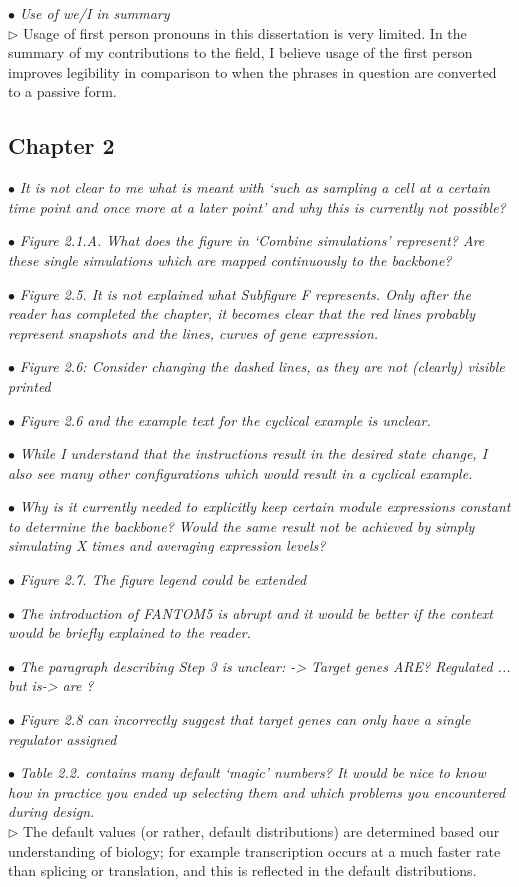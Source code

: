 \documentclass[10pt]{article}
\newcommand{\exam}[2][\  ]{\hspace{0pt}\marginpar{\color{myred}#1}$\bullet$ \textit{#2}}
\newcommand{\answ}[1]{{\color{myblue} $\triangleright$ #1}}
\begin{document}
\exam{Use of we/I in summary} \\
\answ{Usage of first person pronouns in this dissertation is very limited. In the summary of my contributions to the field, I believe usage of the first person improves legibility in comparison to when the phrases in question are converted to a passive form.}



\subsection{Chapter 2}

\exam{It is not clear to me what is meant with ‘such as sampling a cell at a certain
	time point and once more at a later point’ and why this is currently not
	possible?}

\exam{Figure 2.1.A. What does the figure in ‘Combine simulations’ represent? Are
		these single simulations which are mapped continuously to the backbone?}

\exam{Figure 2.5. It is not explained what Subfigure F represents. Only after the
	reader has completed the chapter, it becomes clear that the red lines probably
	represent snapshots and the lines, curves of gene expression.}

\exam{Figure 2.6: Consider changing the dashed lines, as they are not (clearly)
		visible printed}
	
\exam{Figure 2.6 and the example text for the cyclical example is unclear.}

\exam{While I
		understand that the instructions result in the desired state change, I also see
		many other configurations which would result in a cyclical example.}
	
\exam{Why is it currently needed to explicitly keep certain module expressions constant to
		determine the backbone? Would the same result not be achieved by simply
		simulating X times and averaging expression levels?}

\exam{Figure 2.7. The figure legend could be extended}

\exam{The introduction of FANTOM5 is abrupt and it would be better if the context
		would be briefly explained to the reader.}
	
\exam{The paragraph describing Step 3 is unclear: -> Target genes ARE? Regulated
		... but is-> are ?}

\exam{Figure 2.8 can incorrectly suggest that target genes can only have a single
		regulator assigned}


\exam{Table 2.2. contains many default ‘magic’ numbers? It would be nice to know
		how in practice you ended up selecting them and which problems you
		encountered during design.} \\
\answ{The default values (or rather, default distributions) are determined based our understanding of biology; for example transcription occurs at a much faster rate than splicing or translation, and this is reflected in the default distributions.}
\end{document}
